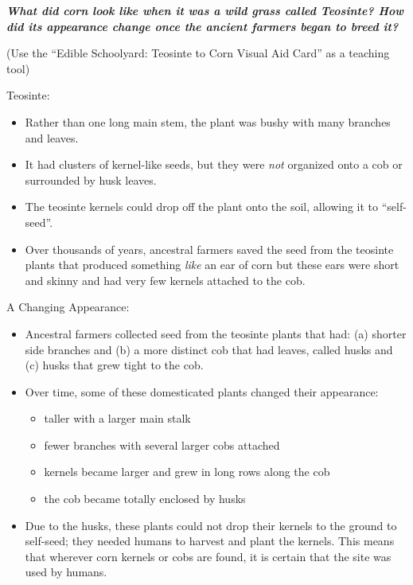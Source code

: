 \documentclass[12pt,]{article}
\providecommand{\tightlist}{%
  \setlength{\itemsep}{0pt}\setlength{\parskip}{0pt}}
\begin{document}
\textbf{\emph{What did corn look like when it was a wild grass called Teosinte? How did its appearance change once the ancient farmers began to breed it? }}

(Use the ``Edible Schoolyard: Teosinte to Corn Visual Aid Card'' as a teaching tool)

{Teosinte}:

\begin{itemize}
\tightlist
\item
  Rather than one long main stem, the plant was bushy with many branches and leaves.
\item
  It had clusters of kernel-like seeds, but they were \emph{not} organized onto a cob or surrounded by husk leaves.
\item
  The teosinte kernels could drop off the plant onto the soil, allowing it to ``self-seed''.
\item
  Over thousands of years, ancestral farmers saved the seed from the teosinte plants that produced something \emph{like} an ear of corn but these ears were short and skinny and had very few kernels attached to the cob.
\end{itemize}

{A Changing Appearance}:

\begin{itemize}
\tightlist
\item
  Ancestral farmers collected seed from the teosinte plants that had: (a) shorter side branches and (b) a more distinct cob that had leaves, called husks and (c) husks that grew tight to the cob.
\item
  Over time, some of these domesticated plants changed their appearance:

  \begin{itemize}
  \tightlist
  \item
    taller with a larger main stalk
  \item
    fewer branches with several larger cobs attached
  \item
    kernels became larger and grew in long rows along the cob
  \item
    the cob became totally enclosed by husks
  \end{itemize}
\item
  Due to the husks, these plants could not drop their kernels to the ground to self-seed; they needed humans to harvest and plant the kernels. This means that wherever corn kernels or cobs are found, it is certain that the site was used by humans.
\end{itemize}
\end{document}
